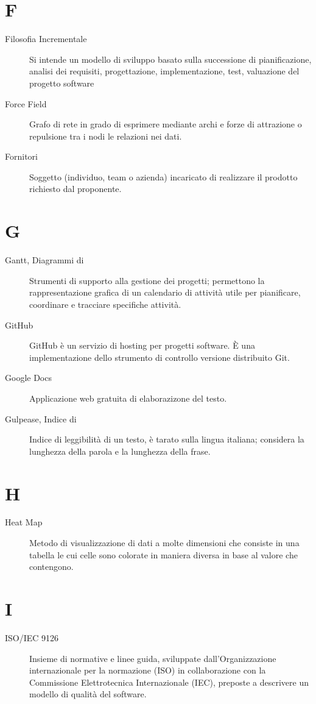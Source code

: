 \documentclass{article}
\begin{document}
\section{F}
\begin{description}
  \item[Filosofia Incrementale] Si intende un modello di sviluppo basato sulla successione di pianificazione, analisi dei requisiti, progettazione, implementazione, test, valuazione del progetto software
  \item[Force Field] Grafo di rete in grado di esprimere mediante archi e forze di attrazione o repulsione tra i nodi le relazioni nei dati. 
  \item[Fornitori] Soggetto (individuo, team o azienda) incaricato di realizzare il prodotto richiesto dal proponente.
\end{description}
\newpage
\section{G}
\begin{description}
  \item[Gantt, Diagrammi di] Strumenti di supporto alla gestione dei progetti; permettono la rappresentazione grafica di un calendario di attività utile per pianificare, coordinare e tracciare specifiche attività.
  \item[GitHub] GitHub è un servizio di hosting per progetti software. È una implementazione dello strumento di controllo versione distribuito Git.
  \item[Google Docs] Applicazione web gratuita di elaborazizone del testo.
  \item[Gulpease, Indice di] Indice di leggibilità di un testo, è tarato sulla lingua italiana; considera la lunghezza della parola e la lunghezza della frase.
\end{description}
\newpage
\section{H}
\begin{description}
  \item[Heat Map] Metodo di visualizzazione di dati a molte dimensioni che consiste in una tabella le cui celle sono colorate in maniera diversa in base al valore che contengono.
\end{description}
\newpage
\section{I}
\begin{description}
  \item[ISO/IEC 9126] Insieme di normative e linee guida, sviluppate dall’Organizzazione internazionale per la normazione (ISO) in collaborazione con la Commissione Elettrotecnica Internazionale (IEC), preposte a descrivere un modello di qualità del software.
\end{description}
\newpage
\end{document}
